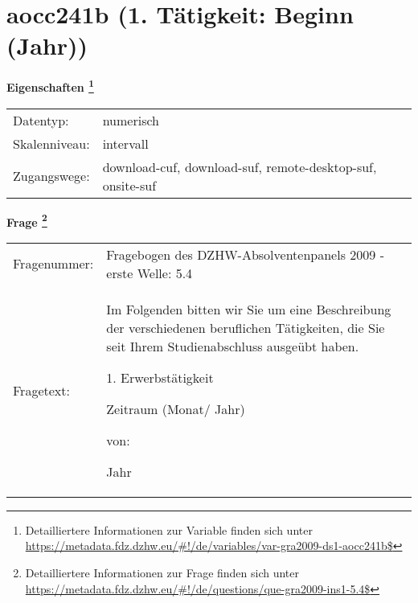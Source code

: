 
    \setcounter{footnote}{0}

    \vspace*{-1.8cm}
	\section{aocc241b (1. Tätigkeit: Beginn (Jahr))}
	\label{section:aocc241b}



    \vspace*{0.5cm}
    \noindent\textbf{Eigenschaften
	\footnote{Detailliertere Informationen zur Variable finden sich unter
		\url{https://metadata.fdz.dzhw.eu/\#!/de/variables/var-gra2009-ds1-aocc241b$}}}\\
	\begin{tabularx}{\hsize}{@{}lX}
	Datentyp: & numerisch \\
	Skalenniveau: & intervall \\
	Zugangswege: &
	  download-cuf, 
	  download-suf, 
	  remote-desktop-suf, 
	  onsite-suf
 \\
    \end{tabularx}



				\vspace*{0.5cm}
                \noindent\textbf{Frage
	                \footnote{Detailliertere Informationen zur Frage finden sich unter
		              \url{https://metadata.fdz.dzhw.eu/\#!/de/questions/que-gra2009-ins1-5.4$}}}\\
				\begin{tabularx}{\hsize}{@{}lX}
					Fragenummer: &
					  Fragebogen des DZHW-Absolventenpanels 2009 - erste Welle:
					  5.4
 \\
					Fragetext: & Im Folgenden bitten wir Sie um eine Beschreibung der verschiedenen beruflichen Tätigkeiten, die Sie seit Ihrem Studienabschluss ausgeübt haben.\par  1. Erwerbstätigkeit\par  Zeitraum (Monat/ Jahr)\par  von:\par  Jahr \\
				\end{tabularx}





